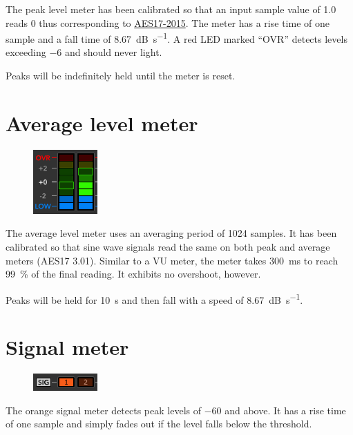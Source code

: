 The peak level meter has been calibrated so that an input sample value
of 1.0 reads \SI{0}{\dBFS} thus corresponding to
\href{http://www.aes.org/publications/standards/search.cfm?docID=21}{AES17-2015}.
The meter has a rise time of one sample and a fall time of
\SI{8.67}{\dB\per\second}.  A red LED marked ``OVR'' detects levels
exceeding \SI{-6}{\dBFS} and should never light.

Peaks will be indefinitely held until the meter is reset.

\newpage %

\section{Average level meter}

\begin{figure}
\includegraphics[scale=\screenshotscale,clip]{include/images/level_meter_average.png}
\end{figure}

The average level meter uses an averaging period of \num{1024}
samples.  It has been calibrated so that sine wave signals read the
same on both peak and average meters (AES17
\SI[retain-explicit-plus]{+3.01}{\dBFS}).  Similar to a VU meter, the
meter takes \SI{300}{\milli\second} to reach \SI{99}{\percent} of the
final reading.  It exhibits no overshoot, however.

Peaks will be held for \SI{10}{\second} and then fall with a speed of
\SI{8.67}{\dB\per\second}.

\section{Signal meter}

\begin{figure}
\includegraphics[scale=\screenshotscale,clip]{include/images/level_meter_signal.png}
\end{figure}

The orange signal meter detects peak levels of \SI{-60}{\dBFS} and
above.  It has a rise time of one sample and simply fades out if the
level falls below the threshold.

